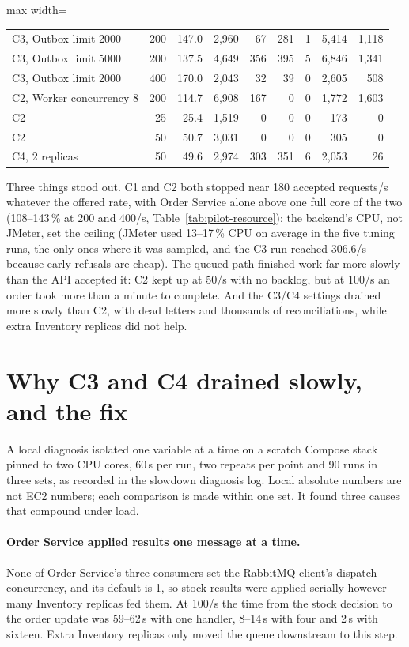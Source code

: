 \documentclass[a4paper]{report}
\begin{document}
\begin{table}[tbp]
\begin{adjustbox}{max width=\linewidth}
\begin{tabular}{@{}lrrrrrrrr@{}}
C3, Outbox limit 2000 & 200 & 147.0 & 2,960 & 67 & 281 & 1 & 5,414 & 1,118 \\
C3, Outbox limit 5000 & 200 & 137.5 & 4,649 & 356 & 395 & 5 & 6,846 & 1,341 \\
C3, Outbox limit 2000 & 400 & 170.0 & 2,043 & 32 & 39 & 0 & 2,605 & 508 \\
C2, Worker concurrency 8 & 200 & 114.7 & 6,908 & 167 & 0 & 0 & 1,772 & 1,603 \\
\midrule
C2 & 25 & 25.4 & 1,519 & 0 & 0 & 0 & 173 & 0 \\
C2 & 50 & 50.7 & 3,031 & 0 & 0 & 0 & 305 & 0 \\
C4, 2 replicas & 50 & 49.6 & 2,974 & 303 & 351 & 6 & 2,053 & 26 \\
\bottomrule
\end{tabular}
\end{adjustbox}
\end{table}

Three things stood out. C1 and C2 both stopped near 180 accepted requests/s
whatever the offered rate, with Order Service alone above one full core of the two (108--143\,\% at 200 and 400/s, Table~\ref{tab:pilot-resource}): the backend's CPU, not JMeter, set the ceiling (JMeter used 13--17\,\% CPU on average in the five tuning runs, the only ones where it was sampled, and the C3 run reached 306.6/s because early
refusals are cheap). The queued path finished work far more slowly than the API
accepted it: C2 kept up at 50/s with no backlog, but at 100/s an order took more
than a minute to complete. And the C3/C4 settings drained more slowly than C2,
with dead letters and thousands of reconciliations, while extra Inventory
replicas did not help.


\section{Why C3 and C4 drained slowly, and the fix}
\label{sec:slowdown}

A local diagnosis isolated one variable at a time on a scratch Compose stack
pinned to two CPU cores, 60\,s per run, two repeats per point and 90 runs in
three sets, as recorded in the slowdown diagnosis log.
Local absolute numbers are not EC2 numbers; each comparison is made within one
set. It found three causes that compound under load.

\paragraph{Order Service applied results one message at a time.} None of Order
Service's three consumers set the RabbitMQ client's dispatch concurrency, and
its default is 1, so stock results were applied serially however many Inventory
replicas fed them. At 100/s the time from the stock decision to the order
update was 59--62\,s with one handler, 8--14\,s with four and 2\,s with sixteen.
Extra Inventory replicas only moved the queue downstream to this step.
\end{document}

